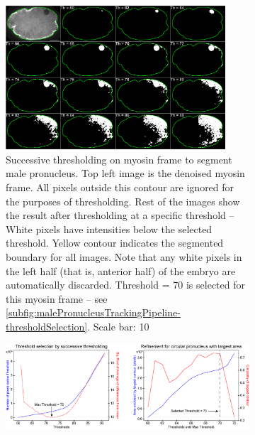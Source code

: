 \begin{figure}[p]
\centering
\begin{subfigure}{\textwidth}
    \centering
    \includegraphics[width=0.9\textwidth]{ExpMethods/FigTrackingPipeline/successiveThreshold.png}
    \caption{Successive thresholding on myosin frame to segment male pronucleus. Top left image is the denoised myosin frame. All pixels outside this contour are ignored for the purposes of thresholding. Rest of the images show the result after thresholding at a specific threshold -- White pixels have intensities below the selected threshold. Yellow contour indicates the segmented boundary for all images. Note that any white pixels in the left half (that is, anterior half) of the embryo are automatically discarded. Threshold = \num{70} is selected for this myosin frame -- see \autoref{subfig:malePronucleusTrackingPipeline-thresholdSelection}. Scale bar: \SI{10}{\unitLength}} 
    \label{subfig:malePronucleusTrackingPipeline-successiveThreshold}
\end{subfigure}
\hfill
\vspace{1mm}
\begin{subfigure}{\textwidth}
    \centering
    \includegraphics[width=\textwidth]{ExpMethods/FigTrackingPipeline/thresholdSelection.png}

\end{subfigure}
\end{figure}
